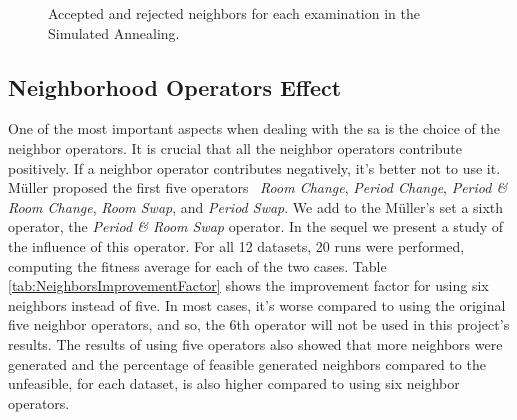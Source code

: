 \begin{figure}[t!]
\centering


\caption{Accepted and rejected neighbors for each examination in the Simulated Annealing.}
\label{fig:AvsRNeighbors} 
\end{figure}
\subsection{Neighborhood Operators Effect}
One of the most important aspects when dealing with the \gls{sa} is the choice of the neighbor operators. It is crucial that all the neighbor operators contribute positively. If a neighbor operator contributes negatively, it's better not to use it. M\"{u}ller proposed the first five operators~\cite{Mueller2009} \textit{Room Change}, \textit{Period Change}, \textit{Period \& Room Change}, \textit{Room Swap}, and \textit{Period Swap}. We add to the M\"{u}ller's set a sixth operator, the \textit{Period \& Room Swap} operator. In the sequel we present a study of the influence of this operator. For all 12 datasets, 20 runs were performed, computing the fitness average for each of the two cases. Table \ref{tab:NeighborsImprovementFactor} shows the improvement factor for using six neighbors instead of five. In most cases, it's worse compared to using the original five neighbor operators, and so, the 6th operator will not be used in this project's results. The results of using five operators also showed that more neighbors were generated and the percentage of feasible generated neighbors compared to the unfeasible, for each dataset, is also higher compared to using six neighbor operators.

